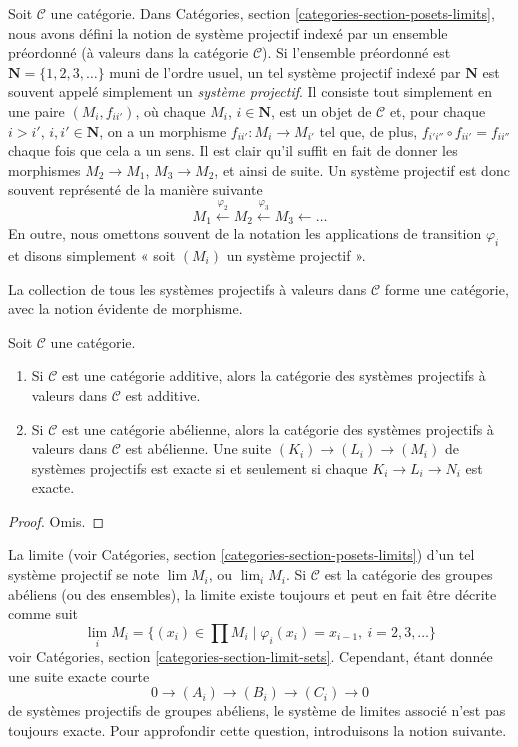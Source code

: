 \noindent
Soit $\mathcal{C}$ une catégorie.
Dans Catégories, section \ref{categories-section-posets-limits},
nous avons défini la notion de système projectif indexé par un ensemble
préordonné (à valeurs dans la catégorie $\mathcal{C}$).
Si l'ensemble préordonné est $\mathbf{N} = \{1, 2, 3, \ldots\}$
muni de l'ordre usuel, un tel système projectif indexé par $\mathbf{N}$
est souvent appelé simplement un {\it système projectif}. Il consiste tout
simplement en une paire $(M_i, f_{ii'})$, où chaque $M_i$,
$i \in \mathbf{N}$, est un objet de $\mathcal{C}$ et, pour chaque
$i > i'$, $i, i' \in \mathbf{N}$, on a un morphisme
$f_{ii'} : M_i \to M_{i'}$ tel que, de plus,
$f_{i'i''} \circ f_{ii'} = f_{ii''}$ chaque fois que cela a un sens.
Il est clair qu'il suffit en fait de donner les morphismes
$M_2 \to M_1$, $M_3 \to M_2$, et ainsi de suite. Un système projectif
est donc souvent représenté de la manière suivante
$$
M_1 \xleftarrow{\varphi_2} M_2 \xleftarrow{\varphi_3} M_3 \leftarrow \ldots
$$
En outre, nous omettons souvent de la notation les applications de transition
$\varphi_i$ et disons simplement « soit $(M_i)$ un système projectif ».

\medskip\noindent
La collection de tous les systèmes projectifs à valeurs dans
$\mathcal{C}$ forme une catégorie, avec la notion évidente de morphisme.

\begin{lemma}
\label{lemma-inverse-systems-abelian}
Soit $\mathcal{C}$ une catégorie.
\begin{enumerate}
\item Si $\mathcal{C}$ est une catégorie additive, alors la catégorie
des systèmes projectifs à valeurs dans $\mathcal{C}$ est additive.
\item Si $\mathcal{C}$ est une catégorie abélienne, alors la catégorie
des systèmes projectifs à valeurs dans $\mathcal{C}$ est abélienne.
Une suite $(K_i) \to (L_i) \to (M_i)$ de systèmes projectifs
est exacte si et seulement si chaque $K_i \to L_i \to N_i$ est exacte.
\end{enumerate}
\end{lemma}

\begin{proof}
Omis.
\end{proof}

\noindent
La limite (voir Catégories, section \ref{categories-section-posets-limits})
d'un tel système projectif se note $\lim M_i$, ou $\lim_i M_i$.
Si $\mathcal{C}$ est la catégorie des groupes abéliens (ou des ensembles),
la limite existe toujours et peut en fait être décrite comme suit
$$
\lim_i M_i
=
\{(x_i) \in \prod M_i \mid \varphi_i(x_i) = x_{i - 1}, \ i = 2, 3, \ldots\}
$$
voir Catégories, section \ref{categories-section-limit-sets}.
Cependant, étant donnée une suite exacte courte
$$
0 \to (A_i) \to (B_i) \to (C_i) \to 0
$$
de systèmes projectifs de groupes abéliens, le système de limites associé
n'est pas toujours exacte. Pour approfondir cette question, introduisons
la notion suivante.

